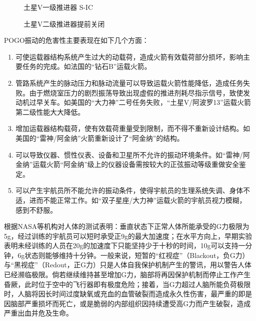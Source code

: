 \begin{figure}[t]
  \begin{center}
    \begin{minipage}{.47\linewidth}
      \caption{土星V一级推进器 S-IC}\label{SaturnV-Stage1}
    \end{minipage}
    \begin{minipage}{.47\linewidth}
      \caption{土星V二级推进器提前关闭}\label{SaturnV-Stage2}
    \end{minipage}
  \end{center}
\end{figure}

POGO振动的危害性主要表现在如下几个方面\cite{Rubin:1970, Wang-Qizheng:1999}：
\begin{enumerate}[leftmargin=\parindent, align=parleft, labelindent=0pt, labelwidth=*]
  \item 可使运载器结构系统产生过大的动载荷，造成火箭有效载荷部分损坏，影响主要任务的完成。如法国的“钻石B”运载火箭。
  \item 管路系统产生的脉动压力和脉动流量可以导致运载火箭性能降低，造成任务失败。由于燃烧室压力的剧烈振荡导致出现虚假的推进剂耗尽指示信号，致使发动机过早关车。如美国的“大力神”二号任务失败，“土星V/阿波罗13”运载火箭第二级性能大大降低。
  \item 增加运载器结构载荷，使有效载荷重量受到限制，而不得不重新设计结构。如美国的“雷神/阿金纳”火箭重新设计了“阿金纳”的结构。
  \item 可以导致仪器、惯性仪表、设备和卫星所不允许的振动环境条件。如“雷神/阿金纳”运载火箭“阿金纳”级上的仪器设备需按较大的正弦振动等级重做安全鉴定。
  \item 可以产生宇航员所不能允许的振动条件，使得宇航员的生理系统失调、身体不适，进而不能正常工作。如“双子星座/大力神”运载火箭的宇航员视力模糊，感到不舒服。
\end{enumerate}

根据NASA等机构对人体的测试表明\cite{Creer:1960, Burton:1988, Davis:2008}：垂直状态下正常人体所能承受的G力极限为5g，经过训练的宇航员可以短时承受正9g的最大加速度；在水平方向上，早期实验表明未经训练的人员在20g的加速度下只能坚持少于十秒的时间，10g可以支持一分钟，6g状态则能够维持十分钟。一般来说，短暂的“红视症”（Blackout，负G力）与“黑视症”（Redout，正G力）只是人体自我保护机制产生的警讯，用以警告人体已经濒临极限。倘若继续维持甚至增加G力，脑部将再因保护机制而停止工作产生昏厥，此时位于空中的飞行器即有极度危险；接着，当G力超过人脑所能负荷极限时，人脑将因长时间过度缺氧或充血的血管破裂而造成永久性伤害，最严重的即是因脑部严重损坏而死亡，或是脆弱的内部组织因持续遭受高G力而产生破裂，造成严重出血并危及生命。

